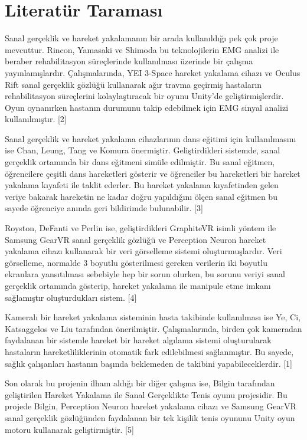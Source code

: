 \documentclass[a4paper, 12pt, titlepage]{article}
\begin{document}
\section{Literatür Taraması}
Sanal gerçeklik ve hareket yakalamanın bir arada kullanıldığı pek çok proje mevcuttur. Rincon,
Yamasaki ve Shimoda bu teknolojilerin EMG analizi ile beraber rehabilitasyon süreçlerinde
kullanılması üzerinde bir çalışma yayınlamışlardır. Çalışmalarında, YEI 3-Space hareket yakalama
cihazı ve Oculus Rift sanal gerçeklik gözlüğü kullanarak ağır travma geçirmiş hastaların
rehabilitasyon süreçlerini kolaylaştıracak bir oyunu Unity’de geliştirmişlerdir. Oyun oynanırken
hastanın durumunu takip edebilmek için EMG sinyal analizi kullanılmıştır. [2]    

Sanal gerçeklik ve hareket yakalama cihazlarının dans eğitimi için kullanılmasını ise Chan, Leung,
Tang ve Komura önermiştir. Geliştirdikleri sistemde, sanal gerçeklik ortamında bir dans eğitmeni
simüle edilmiştir. Bu sanal eğitmen, öğrencilere çeşitli dans hareketleri gösterir ve öğrenciler
bu hareketleri bir hareket yakalama kıyafeti ile taklit ederler. Bu hareket yakalama kıyafetinden
gelen veriye bakarak hareketin ne kadar doğru yapıldığını ölçen sanal eğitmen bu sayede öğrenciye
anında geri bildirimde bulunabilir. [3]

Royston, DeFanti ve Perlin ise, geliştirdikleri GraphiteVR isimli yöntem ile Samsung GearVR sanal
gerçeklik gözlüğü ve Perception Neuron hareket yakalama cihazı kullanarak bir veri görselleme
sistemi oluşturmuşlardır. Veri görselleme, normalde 3 boyutlu gösterilmesi gereken verilerin iki
boyutlu ekranlara yansıtılması sebebiyle hep bir sorun olurken, bu sorunu veriyi sanal gerçeklik
ortamında gösterip, hareket yakalama ile manipule etme imkanı sağlamıştır oluşturdukları sistem.
[4]

Kameralı bir hareket yakalama sisteminin hasta takibinde kullanılması ise Ye, Ci, Katsaggelos ve
Liu tarafından önerilmiştir. Çalışmalarında, birden çok kameradan faydalanan bir sistemle hareket
bir hareket algılama sistemi oluşturularak hastaların hareketliliklerinin otomatik fark
edilebilmesi sağlanmıştır. Bu sayede, sağlık çalışanları hastanın başında beklemeden de takibini
yapabileceklerdir. [1]

Son olarak bu projenin ilham aldığı bir diğer çalışma ise, Bilgin tarafından geliştirilen Hareket
Yakalama ile Sanal Gerçeklikte Tenis oyunu projesidir. Bu projede Bilgin, Perception Neuron hareket
yakalama cihazı ve Samsung GearVR sanal gerçeklik gözlüğünden faydalanan bir tek kişilik tenis
oyununu Unity oyun motoru kullanarak geliştirmiştir. [5]
\newpage
\end{document}
